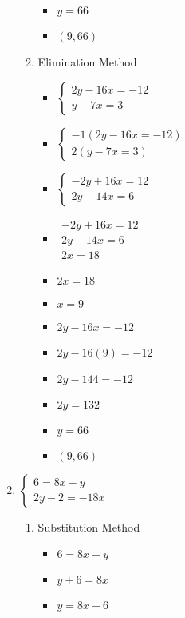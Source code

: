 \documentclass{article}
\begin{document}
\begin{enumerate}
\begin{enumerate}
\begin{itemize}
    \item $y=66$
    \item $(9,66)$
    \end{itemize}
  \item Elimination Method
    \begin{itemize}
    \item $\left\{ \begin{array}{l}
          2y-16x=-12 \\
          y-7x=3 \end{array} \right.$
    \item $\left\{ \begin{array}{l}
          -1(2y-16x=-12) \\
          2(y-7x=3) \end{array} \right.$
    \item $\left\{ \begin{array}{l}
          -2y+16x=12 \\
          2y-14x=6 \end{array} \right.$
    \item $\begin{array}{l}
          -2y+16x=12 \\
          2y-14x=6 \\ \hline
          2x=18\end{array}$
    \item $2x=18$
    \item $x=9$
    \item $2y-16x=-12$
    \item $2y-16(9)=-12$
    \item $2y-144=-12$
    \item $2y=132$
    \item $y=66$
    \item $(9,66)$
    \end{itemize}
  \end{enumerate}
\item $\left\{ \begin{array}{l}
      6=8x-y \\
      2y-2=-18x \end{array} \right.$
  \begin{enumerate}
  \item Substitution Method
    \begin{itemize}
    \item $6=8x-y$
    \item $y+6=8x$
    \item $y=8x-6$

\end{itemize}
\end{enumerate}
\end{enumerate}
\end{document}
